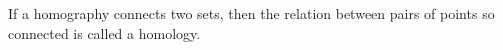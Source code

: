 If a homography connects two sets, then the relation between pairs 
of points so connected is called a homology.